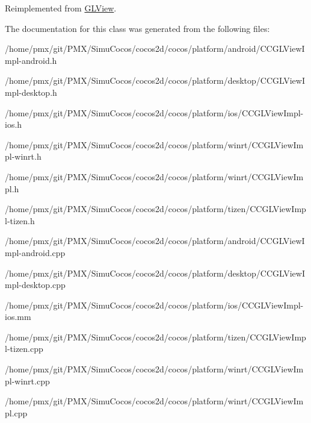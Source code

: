 Reimplemented from \hyperlink{classGLView_aa7a837484fd21d7c0a394e996963e84f}{G\+L\+View}.



The documentation for this class was generated from the following files\+:\begin{DoxyCompactItemize}
\item 
/home/pmx/git/\+P\+M\+X/\+Simu\+Cocos/cocos2d/cocos/platform/android/C\+C\+G\+L\+View\+Impl-\/android.\+h\item 
/home/pmx/git/\+P\+M\+X/\+Simu\+Cocos/cocos2d/cocos/platform/desktop/C\+C\+G\+L\+View\+Impl-\/desktop.\+h\item 
/home/pmx/git/\+P\+M\+X/\+Simu\+Cocos/cocos2d/cocos/platform/ios/C\+C\+G\+L\+View\+Impl-\/ios.\+h\item 
/home/pmx/git/\+P\+M\+X/\+Simu\+Cocos/cocos2d/cocos/platform/winrt/C\+C\+G\+L\+View\+Impl-\/winrt.\+h\item 
/home/pmx/git/\+P\+M\+X/\+Simu\+Cocos/cocos2d/cocos/platform/winrt/C\+C\+G\+L\+View\+Impl.\+h\item 
/home/pmx/git/\+P\+M\+X/\+Simu\+Cocos/cocos2d/cocos/platform/tizen/C\+C\+G\+L\+View\+Impl-\/tizen.\+h\item 
/home/pmx/git/\+P\+M\+X/\+Simu\+Cocos/cocos2d/cocos/platform/android/C\+C\+G\+L\+View\+Impl-\/android.\+cpp\item 
/home/pmx/git/\+P\+M\+X/\+Simu\+Cocos/cocos2d/cocos/platform/desktop/C\+C\+G\+L\+View\+Impl-\/desktop.\+cpp\item 
/home/pmx/git/\+P\+M\+X/\+Simu\+Cocos/cocos2d/cocos/platform/ios/C\+C\+G\+L\+View\+Impl-\/ios.\+mm\item 
/home/pmx/git/\+P\+M\+X/\+Simu\+Cocos/cocos2d/cocos/platform/tizen/C\+C\+G\+L\+View\+Impl-\/tizen.\+cpp\item 
/home/pmx/git/\+P\+M\+X/\+Simu\+Cocos/cocos2d/cocos/platform/winrt/C\+C\+G\+L\+View\+Impl-\/winrt.\+cpp\item 
/home/pmx/git/\+P\+M\+X/\+Simu\+Cocos/cocos2d/cocos/platform/winrt/C\+C\+G\+L\+View\+Impl.\+cpp\end{DoxyCompactItemize}
